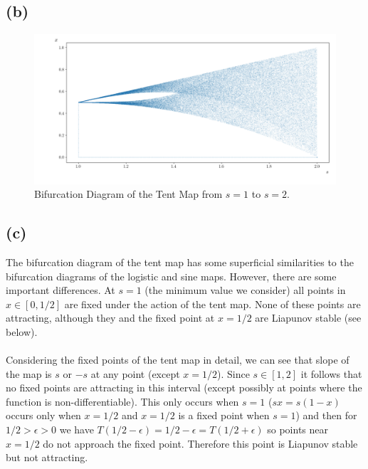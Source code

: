 \documentclass{article}
\begin{document}
\subsection*{(b)}
\begin{figure}[H]
    \centering
    \hspace{-0.5in}
    \includegraphics[scale = 0.5]{Figure_10.png}
	\caption{Bifurcation Diagram of the Tent Map from $s = 1$ to $s=2$.}
    \label{fig:bifn_tent}
\end{figure}

\subsection*{(c)}
The bifurcation diagram of the tent map has some superficial similarities to the bifurcation diagrams of the 
logistic and sine maps. However, there are some important differences. At $s =1$ (the minimum 
value we consider) all points in $x \in [0,1/2]$ are fixed under the action of the tent map. None 
of these points are attracting, although they and the fixed point at $x = 1/2$ are Liapunov stable (see below).

\paragraph{}
Considering the fixed points of the tent map in detail, we can see that slope of the map is 
$s$ or $-s$ at any point (except $x = 1/2$). Since $s \in [1,2]$ it follows that no fixed points are attracting in this 
interval (except possibly at points where the function is non-differentiable). This only occurs when 
$s = 1$ ($sx = s(1-x)$ occurs only when $x = 1/2$ and $x = 1/2$ is a fixed point when $s =1$) 
and then for $1/2 > \epsilon > 0$ we have $T(1/2 - \epsilon) = 1/2 - \epsilon = T(1/2 + \epsilon)$ 
so points near $x = 1/2$ do not approach the fixed point. Therefore this point is Liapunov stable 
but not attracting.
\end{document}
